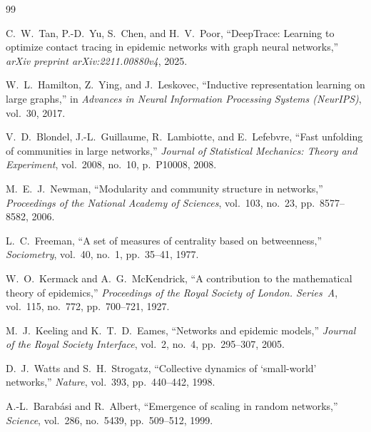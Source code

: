 \documentclass[12pt,a4paper]{report}
\theoremstyle{definition}
\begin{document}
\clearpage
{}
{}
\begin{thebibliography}{99}
\setlength{\itemsep}{6pt}

    C.~W.~Tan, P.-D.~Yu, S.~Chen, and H.~V.~Poor,
    ``DeepTrace: Learning to optimize contact tracing in epidemic networks with graph neural networks,''
    \textit{arXiv preprint arXiv:2211.00880v4}, 2025.

    W.~L.~Hamilton, Z.~Ying, and J.~Leskovec,
    ``Inductive representation learning on large graphs,''
    in \textit{Advances in Neural Information Processing Systems (NeurIPS)},
    vol.~30, 2017.

    V.~D.~Blondel, J.-L.~Guillaume, R.~Lambiotte, and E.~Lefebvre,
    ``Fast unfolding of communities in large networks,''
    \textit{Journal of Statistical Mechanics: Theory and Experiment},
    vol.~2008, no.~10, p.~P10008, 2008.

    M.~E.~J.~Newman,
    ``Modularity and community structure in networks,''
    \textit{Proceedings of the National Academy of Sciences},
    vol.~103, no.~23, pp.~8577--8582, 2006.

    L.~C.~Freeman,
    ``A set of measures of centrality based on betweenness,''
    \textit{Sociometry}, vol.~40, no.~1, pp.~35--41, 1977.

    W.~O.~Kermack and A.~G.~McKendrick,
    ``A contribution to the mathematical theory of epidemics,''
    \textit{Proceedings of the Royal Society of London. Series~A},
    vol.~115, no.~772, pp.~700--721, 1927.

    M.~J.~Keeling and K.~T.~D.~Eames,
    ``Networks and epidemic models,''
    \textit{Journal of the Royal Society Interface},
    vol.~2, no.~4, pp.~295--307, 2005.

    D.~J.~Watts and S.~H.~Strogatz,
    ``Collective dynamics of `small-world' networks,''
    \textit{Nature}, vol.~393, pp.~440--442, 1998.

    A.-L.~Barabási and R.~Albert,
    ``Emergence of scaling in random networks,''
    \textit{Science}, vol.~286, no.~5439, pp.~509--512, 1999.


\end{thebibliography}
\end{document}
